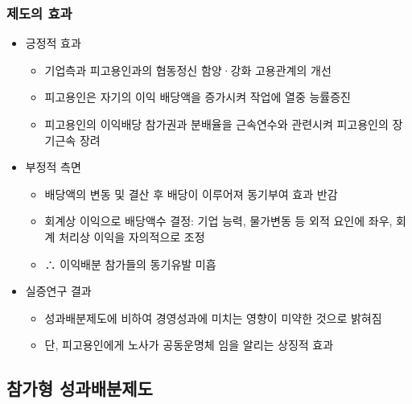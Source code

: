 \documentclass[aspectratio=169,xcolor=dvipsnames,handout]{beamer}
\begin{document}
\begin{frame}[allowframebreaks]
    \frametitle{제도의 효과}
    \begin{itemize}[<+->]
        \item 긍정적 효과
        \begin{itemize}[<+->]
            \item 기업측과 피고용인과의 협동정신 함양·강화 고용관계의 개선
            \item 피고용인은 자기의 이익 배당액을 증가시켜 작업에 열중 능률증진
            \item 피고용인의 이익배당 참가권과 분배율을 근속연수와 관련시켜 피고용인의 장기근속 장려
        \end{itemize}
        \item 부정적 측면 
        \begin{itemize}[<+->]
            \item 배당액의 변동 및 결산 후 배당이 이루어져 동기부여 효과 반감
            \item 회계상 이익으로 배당액수 결정: 기업 능력, 물가변동 등 외적 요인에 좌우, 회계 처리상 이익을 자의적으로 조정
            \item ∴ 이익배분 참가들의 동기유발 미흡
        \end{itemize}
        \item 실증연구 결과
        \begin{itemize}[<+->]
            \item 성과배분제도에 비하여 경영성과에 미치는 영향이 미약한 것으로 밝혀짐
            \item 단, 피고용인에게 노사가 공동운명체 임을 알리는 상징적 효과
        \end{itemize}
    \end{itemize}
\end{frame}

\subsection{참가형 성과배분제도}%
\end{document}
